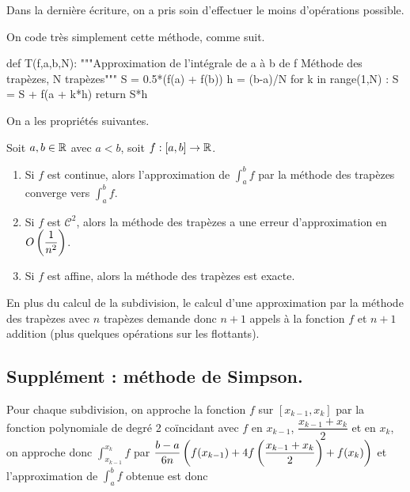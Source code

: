\begin{rem}
  Dans la dernière écriture, on a pris soin d'effectuer le moins d'opérations possible. 
\end{rem}

On code très simplement cette méthode, comme suit. 

\begin{pyverbatim}
def T(f,a,b,N):
    """Approximation de l'intégrale de a à b de f 
    Méthode des trapèzes, N trapèzes"""
    S = 0.5*(f(a) + f(b))
    h = (b-a)/N
    for k in range(1,N) : 
        S = S + f(a + k*h)
    return S*h
\end{pyverbatim}

On a les propriétés suivantes. 

\begin{prop}
  Soit $a,b \in \mathbb{R}$ avec $a<b$, soit $f : [a,b] \to \mathbb{R}$. 
  \begin{enumerate}
    \item Si $f$ est continue, alors l'approximation de $\displaystyle\int_a^b f$ par la méthode des trapèzes converge vers $\displaystyle\int_a^b f$. 
    \item Si $f$ est $\mathscr{C}^2$, alors la méthode des trapèzes a une erreur d'approximation en $O\left( \dfrac{1}{n^2}\right)$. 
    \item Si $f$ est affine, alors la méthode des trapèzes est exacte. 
  \end{enumerate}
\end{prop}

\begin{rem}
  En plus du calcul de la subdivision, le calcul d'une approximation par la méthode des trapèzes avec $n$ trapèzes demande donc $n+1$ appels à la fonction $f$ et $n+1$ addition (plus quelques opérations sur les flottants).
\end{rem}

\subsection{Supplément : méthode de Simpson.}

Pour chaque subdivision, on approche la fonction $f$ sur $[x_{k-1},x_{k}]$ par la fonction polynomiale de degré 2 coïncidant avec $f$ en $x_{k-1}$, $\dfrac{x_{k-1} + x_k}{2}$ et en $x_k$, on approche donc $\displaystyle\int_{x_{k-1}}^{x_{k}} f$ par $\dfrac{b-a}{6n}\left( f(x_{k-1}) + 4 f\left( \dfrac{x_{k-1} + x_k}{2}\right)+ f(x_k)\right)$ et l'approximation de  $\displaystyle\int_a^b f$ obtenue est donc 

